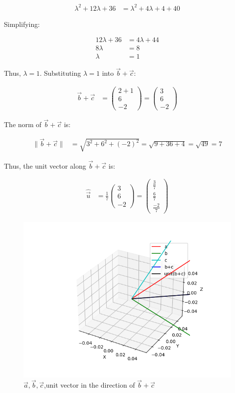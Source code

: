 \documentclass[journal]{IEEEtran}
\numberwithin{figure}{enumi}
\begin{document}
\begin{align}
\lambda^2 + 12\lambda + 36 &= \lambda^2 + 4\lambda + 4 + 40
\end{align}

Simplifying:

\begin{align}
12\lambda + 36 &= 4\lambda + 44 \\
8\lambda &= 8 \\
\lambda &= 1
\end{align}

Thus, $\lambda = 1$. Substituting $\lambda = 1$ into $\vec{b} + \vec{c}$:

\begin{align}
\vec{b} + \vec{c} &= \begin{pmatrix} 2 + 1 \\ 6 \\ -2 \end{pmatrix} = \begin{pmatrix} 3 \\ 6 \\ -2 \end{pmatrix}
\end{align}

The norm of $\vec{b} + \vec{c}$ is:

\begin{align}
\|\vec{b} + \vec{c}\| &= \sqrt{3^2 + 6^2 + (-2)^2} = \sqrt{9 + 36 + 4} = \sqrt{49} = 7
\end{align}

Thus, the unit vector along $\vec{b} + \vec{c}$ is:

\begin{align}
\hat{\vec{u}} &= \frac{1}{7} \begin{pmatrix} 3 \\ 6 \\ -2 \end{pmatrix} = \begin{pmatrix} \frac{3}{7} \\ \frac{6}{7} \\ \frac{-2}{7} \end{pmatrix}
\end{align}

\begin{figure}[h!]
	\centering
	\includegraphics[width=0.5\linewidth]{figs/Figure_1.png}
	\caption{ $\vec{a},\vec{b},\vec{c}$,unit vector in the direction of  $\vec{b}+\vec{c}$}
	\label{stemplot}
\end{figure}	
\end{document}

